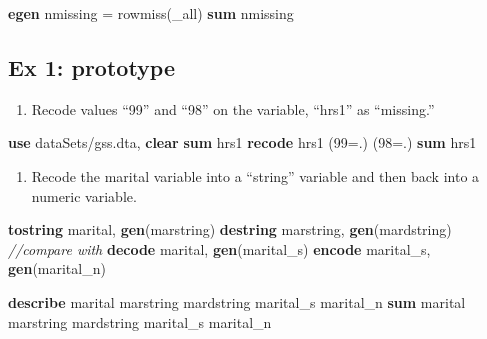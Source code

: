 \documentclass[
]{book}
\newenvironment{Shaded}{\begin{snugshade}}{\end{snugshade}}
\newcommand{\CommentTok}[1]{\textcolor[rgb]{0.56,0.35,0.01}{\textit{#1}}}
\newcommand{\DataTypeTok}[1]{\textcolor[rgb]{0.13,0.29,0.53}{#1}}
\newcommand{\FunctionTok}[1]{\textcolor[rgb]{0.00,0.00,0.00}{#1}}
\newcommand{\KeywordTok}[1]{\textcolor[rgb]{0.13,0.29,0.53}{\textbf{#1}}}
\newcommand{\NormalTok}[1]{#1}
\providecommand{\tightlist}{%
  \setlength{\itemsep}{0pt}\setlength{\parskip}{0pt}}
\begin{document}
\begin{Shaded}
\begin{Highlighting}[]
  \KeywordTok{egen}\NormalTok{ nmissing = }\FunctionTok{rowmiss}\NormalTok{(}\DataTypeTok{_all}\NormalTok{)}
  \KeywordTok{sum}\NormalTok{ nmissing}
\end{Highlighting}
\end{Shaded}

\hypertarget{ex-1-prototype-7}{%
\subsection{Ex 1: prototype}\label{ex-1-prototype-7}}

\begin{enumerate}
\def\labelenumi{\arabic{enumi}.}
\tightlist
\item
  Recode values ``99'' and ``98'' on the variable, ``hrs1'' as ``missing.''
\end{enumerate}

\begin{Shaded}
\begin{Highlighting}[]
  \KeywordTok{use}\NormalTok{ dataSets/gss.dta, }\KeywordTok{clear}
  \KeywordTok{sum}\NormalTok{ hrs1}
  \KeywordTok{recode}\NormalTok{ hrs1 (99=.) (98=.) }
  \KeywordTok{sum}\NormalTok{ hrs1}
\end{Highlighting}
\end{Shaded}

\begin{enumerate}
\def\labelenumi{\arabic{enumi}.}
\setcounter{enumi}{1}
\tightlist
\item
  Recode the marital variable into a ``string'' variable and then back into a numeric variable.
\end{enumerate}

\begin{Shaded}
\begin{Highlighting}[]
  \KeywordTok{tostring}\NormalTok{ marital, }\KeywordTok{gen}\NormalTok{(marstring)}
  \KeywordTok{destring}\NormalTok{ marstring, }\KeywordTok{gen}\NormalTok{(mardstring)}
  \CommentTok{//compare with}
  \KeywordTok{decode}\NormalTok{ marital, }\KeywordTok{gen}\NormalTok{(marital_s)}
  \KeywordTok{encode}\NormalTok{ marital_s, }\KeywordTok{gen}\NormalTok{(marital_n)}

  \KeywordTok{describe}\NormalTok{ marital marstring mardstring marital_s marital_n}
  \KeywordTok{sum}\NormalTok{ marital marstring mardstring marital_s marital_n}
\end{Highlighting}
\end{Shaded}
\end{document}
